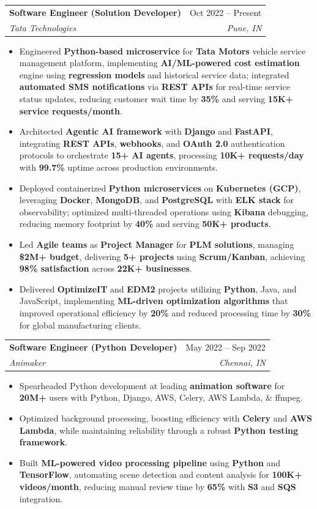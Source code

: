 \documentclass[letterpaper,10pt]{article}
\makeatletter
\newcommand{\resumeItem}[1]{
  \item\small{
    {#1 \vspace{-3.5pt}}
  }
}
\newcommand{\resumeSubheading}[4]{
  \item
    \begin{tabular*}{0.99\textwidth}[t]{l@{\extracolsep{\fill}}r}
      \textbf{#1} & #2 \\
      \textit{\small#3} & \textit{\small #4} \\
    \end{tabular*}\vspace{-8pt}
}
\newcommand{\resumeItemListStart}{\begin{itemize}[leftmargin=0.15in]}
\newcommand{\resumeItemListEnd}{\end{itemize}\vspace{-6pt}}
\makeatother
\begin{document}
    \resumeSubheading
      {Software Engineer (Solution Developer)}{Oct 2022 -- Present}
      {Tata Technologies}{Pune, IN}
      \resumeItemListStart
        \resumeItem{Engineered \textbf{Python-based microservice} for \textbf{Tata Motors} vehicle service management platform, implementing \textbf{AI/ML-powered cost estimation} engine using \textbf{regression models} and historical service data; integrated \textbf{automated SMS notifications} via \textbf{REST APIs} for real-time service status updates, reducing customer wait time by \textbf{35\%} and serving \textbf{15K+ service requests/month}.}
        \resumeItem{Architected \textbf{Agentic AI framework} with \textbf{Django} and \textbf{FastAPI}, integrating \textbf{REST APIs}, \textbf{webhooks}, and \textbf{OAuth 2.0} authentication protocols to orchestrate \textbf{15+ AI agents}, processing \textbf{10K+ requests/day} with \textbf{99.7\%} uptime across production environments.}
        \resumeItem{Deployed containerized \textbf{Python microservices} on \textbf{Kubernetes (GCP)}, leveraging \textbf{Docker}, \textbf{MongoDB}, and \textbf{PostgreSQL} with \textbf{ELK stack} for observability; optimized multi-threaded operations using \textbf{Kibana} debugging, reducing memory footprint by \textbf{40\%} and serving \textbf{50K+ products}.}
        \resumeItem{Led \textbf{Agile teams} as \textbf{Project Manager} for \textbf{PLM solutions}, managing \textbf{\$2M+ budget}, delivering \textbf{5+ projects} using \textbf{Scrum/Kanban}, achieving \textbf{98\% satisfaction} across \textbf{22K+ businesses}.}
        \resumeItem{Delivered \textbf{OptimizeIT} and \textbf{EDM2} projects utilizing \textbf{Python}, Java, and JavaScript, implementing \textbf{ML-driven optimization algorithms} that improved operational efficiency by \textbf{20\%} and reduced processing time by \textbf{30\%} for global manufacturing clients.}
      \resumeItemListEnd

    \resumeSubheading
      {Software Engineer (Python Developer)}{May 2022 -- Sep 2022}
      {Animaker}{Chennai, IN}
      \resumeItemListStart
        \resumeItem{Spearheaded Python development at leading \textbf{animation software} for \textbf{20M+} users with Python, Django, AWS, Celery, AWS Lambda, \& ffmpeg.}
        \resumeItem{Optimized background processing, boosting efficiency with \textbf{Celery} and \textbf{AWS Lambda}, while maintaining reliability through a robust \textbf{Python testing framework}.}
        \resumeItem{Built \textbf{ML-powered video processing pipeline} using \textbf{Python} and \textbf{TensorFlow}, automating scene detection and content analysis for \textbf{100K+ videos/month}, reducing manual review time by \textbf{65\%} with \textbf{S3} and \textbf{SQS} integration.}
      \resumeItemListEnd
\end{document}
